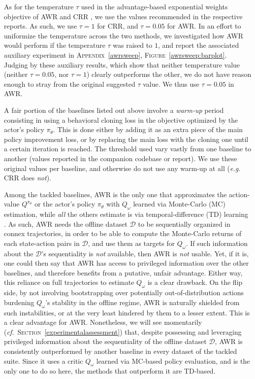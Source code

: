 As for the temperature $\tau$ used in the advantage-based exponential weights objective of
AWR \cite{Peng2019-hu}
and CRR \cite{Wang2020-sr},
we use the values recommended in the respective reports.
As such, we use $\tau = 1$ for CRR, and $\tau = 0.05$ for AWR.
In an effort to uniformize the temperature across the two methods, we investigated how AWR would perform
if the temperature $\tau$ was raised to $1$, and report the associated auxiliary experiment in
\textsc{Appendix}~\ref{awrsweep}, \textsc{Figure}~\ref{awrsweep:barplot}.
Judging by these auxiliary results, which show that neither temperature value
(neither $\tau = 0.05$, nor $\tau = 1$)
clearly outperforms the other,
we do not have reason enough to stray from the original suggested $\tau$ value.
We thus use $\tau = 0.05$ in AWR.

A fair portion of the baselines listed out above involve a \emph{warm-up} period consisting in using
a behavioral cloning loss in the objective optimized by the actor's policy $\pi_\theta$. This is done
either by adding it as an extra piece of the main policy improvement loss, or by replacing the main loss
with the cloning one until a certain iteration is reached.
The threshold used vary vastly from one baseline to another (values reported in the companion codebase or report).
We use these original values per baseline,
and otherwise do not use any warm-up at all
(\textit{e.g.} CRR \cite{Wang2020-sr} does \emph{not}).

Among the tackled baselines, AWR \cite{Peng2019-hu}
is the only one that approximates the action-value $Q^{\pi_\theta}$ or the actor's policy $\pi_\theta$
with $Q_\omega$ learned via Monte-Carlo (MC) estimation, while \emph{all} the others estimate is via
temporal-difference (TD) learning \cite{Sutton1984-ce, Sutton1988-to, Sutton1999-ii}.
As such, AWR needs the offline dataset $\mathcal{D}$ to be sequentially organized in connex trajectories, in
order to be able to compute the Monte-Carlo returns of each state-action pairs in $\mathcal{D}$,
and use them as targets for $Q_\omega$.
If such information about the $\mathcal{D}$'s sequentiality is \emph{not} available, then AWR is \emph{not} usable.
Yet, if it is, one could then say that AWR has access to privileged information over the other baselines, and
therefore benefits from a putative, unfair advantage.
Either way, this reliance on full trajectories to estimate $Q_\omega$ is a clear drawback.
On the flip side, by not involving bootstrapping over potentially out-of-distribution actions
burdening $Q_\omega$'s stability in the offline regime, AWR is naturally shielded from such instabilities,
or at the very least hindered by them to a lesser extent.
This is a clear advantage for AWR.
Nonetheless, we will see momentarily (\textit{cf.}~\textsc{Section}~\ref{experimentalassessment})
that, despite possessing and leveraging privileged information about the sequentiality
of the offline dataset $\mathcal{D}$,
AWR is consistently outperformed by another baseline in every dataset of the tackled suite.
Since it uses a critic $Q_\omega$ learned via MC-based policy evaluation, and is the only one to do so here,
the methods that outperform it are TD-based.

